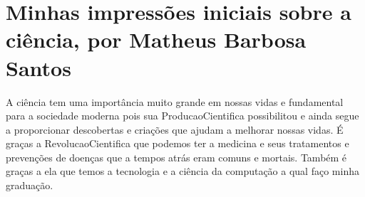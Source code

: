 \section{Minhas impressões iniciais sobre a ciência, por Matheus Barbosa Santos}

A ciência tem uma importância muito grande em nossas vidas e fundamental para a sociedade moderna pois sua \gls{ProducaoCientifica} possibilitou e ainda segue a proporcionar descobertas e criações que ajudam a melhorar nossas vidas. É graças a \gls{RevolucaoCientifica} que podemos ter a medicina e seus tratamentos e prevenções de doenças que a tempos atrás eram comuns e mortais.  Também é graças a ela que temos a tecnologia e a ciência da computação a qual faço minha graduação.
